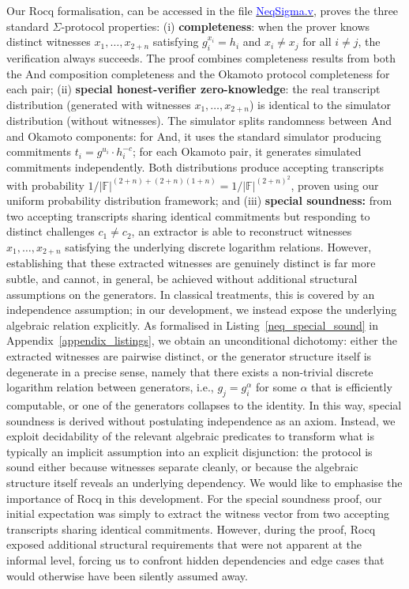 \documentclass[sigconf,anonymous,review]{acmart}
\begin{document}
Our Rocq formalisation, can be accessed in the file \href{https://anonymous.4open.science/r/SigmaProtocol-EBA5/src/Crypto/NeqSigma.v}{\textcolor{blue}{NeqSigma.v}}, proves the three standard $\Sigma$-protocol properties: (i) \textbf{completeness}: 
when the prover knows distinct witnesses $x_1, \ldots, x_{2+n}$ satisfying $g_i^{x_i} = h_i$ and $x_i \neq x_j$ 
for all $i \neq j$, the verification always succeeds. The proof combines completeness results from both the And composition completeness and the Okamoto protocol completeness for each pair; (ii) \textbf{special honest-verifier zero-knowledge}: 
the real transcript distribution (generated with witnesses $x_1, \ldots, x_{2+n}$) is identical to the 
simulator distribution (without witnesses). The simulator splits randomness between And and Okamoto 
components: for And, it uses the standard simulator producing commitments $t_i = g^{u_i} \cdot h_i^{-c}$; 
for each Okamoto pair, it generates simulated commitments independently. Both distributions produce 
accepting transcripts with probability $1/|\mathbb{F}|^{(2+n) + (2+n)(1+n)} = 1/|\mathbb{F}|^{(2+n)^2}$, proven 
using our uniform probability distribution framework; and (iii) \textbf{special soundness:} from two accepting transcripts sharing identical commitments but responding to distinct challenges \(c_1 \neq c_2\), an extractor is able to reconstruct witnesses \(x_1, \ldots, x_{2+n}\) satisfying the underlying discrete logarithm relations.  However, establishing that these extracted witnesses are genuinely distinct is far more subtle, and cannot, in general, be achieved without additional structural assumptions on the generators. In classical treatments, this is covered by an independence assumption; in our development, we instead expose the underlying algebraic relation explicitly. As formalised in Listing~\ref{neq_special_sound} in Appendix~\ref{appendix_listings}, we obtain an unconditional dichotomy: either the extracted witnesses are pairwise distinct, or the generator structure itself is degenerate in a precise sense, namely that there exists a non-trivial discrete logarithm relation between generators, i.e., \(g_j = g_i^\alpha\) for some \(\alpha\) that is efficiently computable, or one of the generators collapses to the identity.  In this way, special soundness is derived without postulating independence as an axiom. Instead, we exploit decidability of the relevant algebraic predicates to transform what is typically an implicit assumption into an explicit disjunction:
the protocol is sound either because witnesses separate cleanly, or because the algebraic structure itself reveals an underlying dependency. We would like to emphasise the importance of Rocq in this development. For the special soundness proof, our initial expectation was simply to extract the witness vector from two accepting transcripts sharing identical commitments. However, during the proof, Rocq exposed additional structural requirements that were not apparent at the informal level, forcing us to confront hidden dependencies and edge cases that would otherwise have been silently assumed away.
\end{document}
